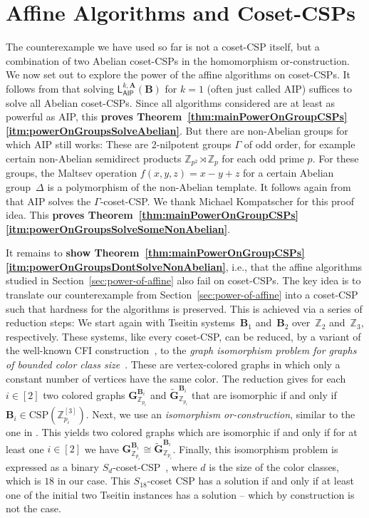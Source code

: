 \documentclass[a4paper,english, thm-restate]{lipics-v2021}
\newcommand{\ZZ}{\mathbb{Z}}
\newcommand{\CFIsym}{\mathbf{G}}
\newcommand{\CFIA}[2]{\CFIsym_{#1}^{#2}}
\newcommand{\CFIB}[2]{\widetilde{\CFIsym}_{#1}^{#2}}
\newcommand{\StructA}{\mathbf{A}}
\newcommand{\StructB}{\mathbf{B}}
\newcommand{\CSP}[1]{\mathrm{CSP}(#1)}
\newcommand{\leqs}{\mathsf{L}}
\newcommand{\aipk}[3]{\leqs^{#1,#2}_{\mathsf{AIP}} (#3)}
\newcommand{\bbZ}{\mathbb{Z}}
\newcommand{\CosetGrpTmplt}[2]{#1^{[#2]}}
\newcommand{\Sym}[1]{S_{#1}}
\begin{document}
	
	\section{Affine Algorithms and Coset-CSPs}	
	\label{sec:groupStuff}
	
	The counterexample we have used so far is not a coset-CSP itself, but a combination of two Abelian coset-CSPs in the homomorphism or-construction.
	We now set out to explore the power of the affine algorithms on coset-CSPs.
	It follows from \cite{BartoBKO2021} that solving $\aipk{k}{\StructA}{\StructB}$ for $k=1$ (often just called AIP) suffices to solve all Abelian coset-CSPs. Since all algorithms considered are at least as powerful as AIP,
	this \textbf{proves Theorem~\ref{thm:mainPowerOnGroupCSPs}\ref{itm:powerOnGroupsSolveAbelian}}.
	But there are non-Abelian groups for which AIP still works: These are 2-nilpotent groups $\Gamma$ of odd order, for example certain non-Abelian semidirect products $\bbZ_{p^2} \rtimes \bbZ_p$ for each odd prime $p$. For these groups, the Maltsev operation $f(x,y,z) = x-y+z$ for a certain Abelian group~$\Delta$ is a polymorphism of the non-Abelian template.
	It follows again from \cite{BartoBKO2021} that AIP solves the $\Gamma$-coset-CSP. We thank Michael Kompatscher for this proof idea.
	This \textbf{proves Theorem~\ref{thm:mainPowerOnGroupCSPs}\ref{itm:powerOnGroupsSolveSomeNonAbelian}}.
	
	
	It remains to \textbf{show Theorem~\ref{thm:mainPowerOnGroupCSPs}\ref{itm:powerOnGroupsDontSolveNonAbelian}},
	i.e., that the affine algorithms studied in Section~\ref{sec:power-of-affine} also fail on coset-CSPs.
	The key idea is to translate our counterexample from Section~\ref{sec:power-of-affine}
	into a coset-CSP such that hardness for the algorithms is preserved.
	This is achieved via a series of reduction steps: We start again with Tseitin systems~$\StructB_1$ and~$\StructB_2$ over~$\bbZ_2$ and~$\bbZ_3$, respectively.
These systems, like every coset-CSP, can be reduced, by a variant of the well-known CFI construction~\cite{CaiFuererImmerman1992}, to the \emph{graph isomorphism problem for graphs of bounded color class size}~\cite{BerkholzGrohe2017}. These are vertex-colored graphs in which only a constant number of vertices have the same color.
	The reduction gives for each $i \in [2]$ two colored graphs $\CFIA{\bbZ_{p_i}}{\StructB_i}$ and $\CFIB{\bbZ_{p_i}}{\StructB_i}$ that are isomorphic if and only if $\StructB_i \in \CSP{\CosetGrpTmplt{\ZZ_{p_i}}{3}}$. 
	Next, we use an \emph{isomorphism or-construction}, similar to the one in \cite{BerkholzGrohe2017}. This yields two colored graphs which are isomorphic if and only if for at least one $i \in [2]$ we have $\CFIA{\bbZ_{p_i}}{\StructB_i} \cong \CFIB{\bbZ_{p_i}}{\StructB_i}$. 
	Finally, this isomorphism problem is expressed as a binary $\Sym{d}$-coset-CSP~\cite{BerkholzGrohe2017}, where $d$ is the size of the color classes, which is $18$ in our case.  
	This $\Sym{18}$-coset CSP has a solution if and only if at least one of the initial two Tseitin instances has a solution -- which by construction is not the case. 
	
\end{document}
